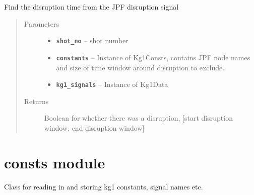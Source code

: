 \documentclass[letterpaper,10pt,english]{sphinxmanual}
\begin{document}
\begin{fulllineitems}
\label{find_disruption:find_disruption.find_disruption}
Find the disruption time from the JPF disruption signal
\begin{quote}\begin{description}
\item[{Parameters}] \leavevmode\begin{itemize}
\item {} 
\textbf{\texttt{shot\_no}} -- shot number

\item {} 
\textbf{\texttt{constants}} -- Instance of Kg1Consts, contains JPF node names and size of time window around disruption to exclude.

\item {} 
\textbf{\texttt{kg1\_signals}} -- Instance of Kg1Data

\end{itemize}

\item[{Returns}] \leavevmode
Boolean for whether there was a disruption, {[}start disruption window, end disruption window{]}

\end{description}\end{quote}

\end{fulllineitems}



\section{consts module}
\label{consts:consts-module}\label{consts:module-consts}\label{consts::doc}
Class for reading in and storing kg1 constants,
signal names etc.
\end{document}
